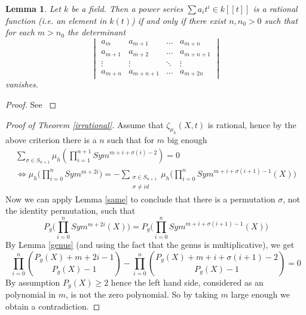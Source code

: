 \documentclass[11pt, a4paper, german]{article}
\theoremstyle{plain}
\newtheorem{lemma}[theorem]{Lemma}
\theoremstyle{definition}
\begin{document}
\begin{lemma}
    Let $k$ be a field. Then a power series $\sum a_it^i \in k[[t]]$  is a rational function (i.e. an element in $k(t)$) if and only if
    there exist $n, n_0 > 0$ such that for each $m > n_0$ the determinant
    \[
        \begin{vmatrix}
            a_m     & a_{m+1} & \dots & a_{m+n} \\
            a_{m+1} & a_{m+2} & \dots & a_{m+n+1} \\
            \vdots  & \vdots  & \ddots & \vdots \\
            a_{m+n} & a_{m+n+1} & \dots & a_{m+2n}
        \end{vmatrix}
    \]
    vanishes.
\end{lemma}
\begin{proof}
    See \cite[Section 5.3, Lem. 1]{MR0241425}
\end{proof}

\begin{proof}[Proof of Theorem \ref{irrational}]
    Assume that $\zeta_{\mu_h}(X,t)$ is rational, hence by the above criterion there is a $n$ such that for $m$ big enough
    \begin{equation}
        \begin{split}
        \sum_{\sigma \in S_{n+1}} \mu_h ( \prod_{i=1}^{n+1} Sym^{m + i + \sigma(i) - 2}) = 0  \\
        \Leftrightarrow
        \mu_h \Big ( \prod_{i=0}^n Sym^{m + 2i} \Big ) = - \sum_{\substack{\sigma \in S_{n+1} \\ \sigma \neq id}} 
        \mu_h \Big ( \prod_{i=0}^n Sym^{m + i + \sigma(i+1) - 1}(X) \Big )
    \end{split}
    \end{equation}
    Now we can apply Lemma \ref{same} to conclude that there is a permutation $\sigma$, not the identity permutation, such that
    \[
        P_g \Big(\prod_{i=0}^n Sym^{m+2i}(X)\Big) = P_g \Big( \prod_{i=0}^n Sym^{m+i+\sigma(i+1) - 1}(X) \Big)
    \]
    By Lemma \ref{genus} (and using the fact that the genus is multiplicative), we get
    \[
        \prod_{i=0}^n \binom{P_g(X) + m + 2i - 1}{P_g(X) - 1} - \prod_{i=0}^n \binom{P_g(X) + m + i + \sigma(i+1) - 2}{P_g(X) - 1} = 0
    \]
    By assumption $P_g(X) \geq 2$ hence the left hand side, considered as an polynomial in $m$, is not the zero polynomial. So by taking
    $m$ large enough we obtain a contradiction.
\end{proof}




{}

\end{document}
